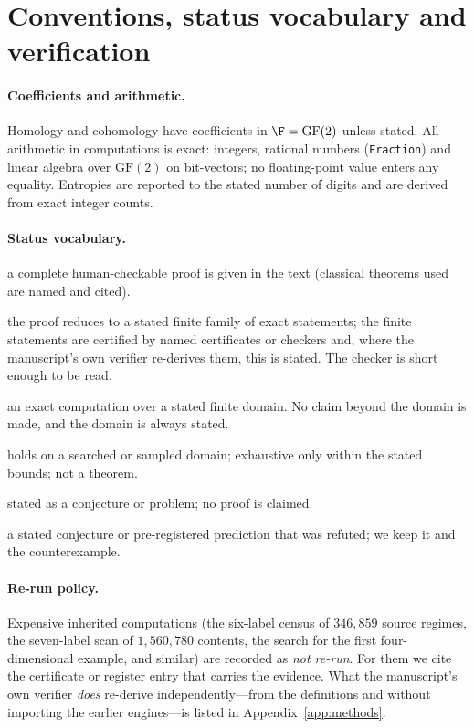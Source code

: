 \section{Conventions, status vocabulary and verification}\label{sec:conventions}
\paragraph{Coefficients and arithmetic.} Homology and cohomology have coefficients in $\F=\mathrm{GF}(2)$ unless stated. All arithmetic in computations is exact: integers, rational numbers (\texttt{Fraction}) and linear algebra over $\mathrm{GF}(2)$ on bit-vectors; no floating-point value enters any equality. Entropies are reported to the stated number of digits and are derived from exact integer counts.
\paragraph{Status vocabulary.}
\begin{description}[leftmargin=1.2em,labelsep=0.5em,itemsep=0.1em]
\item[Analytic] a complete human-checkable proof is given in the text (classical theorems used are named and cited).
\item[Computer-assisted] the proof reduces to a stated finite family of exact statements; the finite statements are certified by named certificates or checkers and, where the manuscript's own verifier re-derives them, this is stated. The checker is short enough to be read.
\item[Finite-exact] an exact computation over a stated finite domain. No claim beyond the domain is made, and the domain is always stated.
\item[Bounded] holds on a searched or sampled domain; exhaustive only within the stated bounds; not a theorem.
\item[Conjectural / open] stated as a conjecture or problem; no proof is claimed.
\item[Falsified] a stated conjecture or pre-registered prediction that was refuted; we keep it and the counterexample.
\end{description}
\paragraph{Re-run policy.} Expensive inherited computations (the six-label census of $346{,}859$ source regimes, the seven-label scan of $1{,}560{,}780$ contents, the search for the first four-dimensional example, and similar) are recorded as \emph{not re-run}. For them we cite the certificate or register entry that carries the evidence. What the manuscript's own verifier \emph{does} re-derive independently---from the definitions and without importing the earlier engines---is listed in Appendix~\ref{app:methods}.

